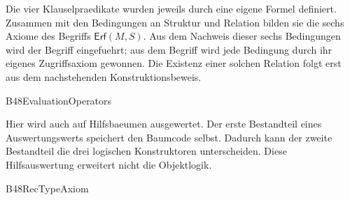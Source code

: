 Die vier Klauselpraedikate wurden jeweils durch eine eigene Formel
definiert. Zusammen mit den Bedingungen an Struktur und Relation bilden
sie die sechs Axiome des Begriffs \(\mathsf{Erf}(M,S)\).
Aus dem Nachweis dieser sechs Bedingungen wird der Begriff eingefuehrt;
aus dem Begriff wird jede Bedingung durch ihr eigenes Zugriffsaxiom
gewonnen. Die Existenz einer solchen Relation folgt erst aus dem
nachstehenden Konstruktionsbeweis.

{B48EvaluationOperators}{}

Hier wird auch auf Hilfsbaeumen ausgewertet. Der erste Bestandteil eines
Auswertungswerts speichert den Baumcode selbst. Dadurch kann der zweite
Bestandteil die drei logischen Konstruktoren unterscheiden.
Diese Hilfsauswertung erweitert nicht die Objektlogik.


{B48RecTypeAxiom}{}

